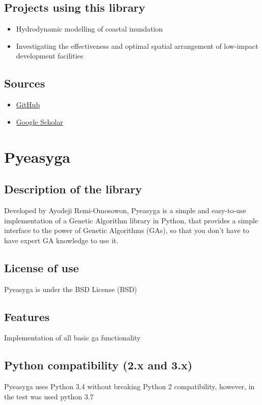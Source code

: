 \documentclass{article}
\begin{document}
\subsection{Projects using this library}
\begin{itemize}
    \item Hydrodynamic modelling of coastal inundation
    \item Investigating the effectiveness and optimal spatial         arrangement of low-impact development facilities
\end{itemize}
\subsection{Sources}
 \begin{itemize}
     \item \href{https://github.com/inspectorG4dget/Genetic-Framework/tree/master/pyvolution/Documentation}{GitHub}
         \item \href{https://scholar.google.com/scholar?hl=it&as_sdt=02C5&q=pyeasyga&btnG=}{Google Scholar}
 \end{itemize}
 
\section{Pyeasyga}
\subsection{Description of the library}
 Developed by Ayodeji Remi-Omosowon, Pyeasyga is a  simple and easy-to-use implementation of a Genetic Algorithm library in Python, that provides a simple interface to the power of Genetic Algorithms (GAs), so that you don’t have to have expert GA knowledge to use it. 
\subsection{License of use}
Pyeasyga is under the  BSD License (BSD)
\subsection{Features}
 Implementation of all basic ga functionality
\subsection{Python compatibility (2.x and 3.x)}
Pyeasyga uses Python 3.4  without breaking Python 2 compatibility, however, in the test was used python 3.7
\end{document}
